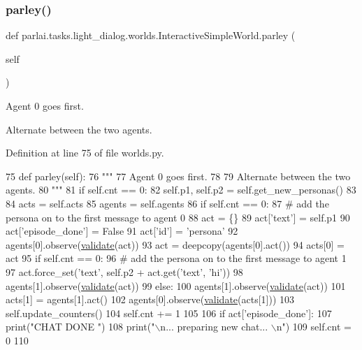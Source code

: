 \subsubsection{\texorpdfstring{parley()}{parley()}}
{\footnotesize\ttfamily def parlai.\+tasks.\+light\+\_\+dialog.\+worlds.\+Interactive\+Simple\+World.\+parley (\begin{DoxyParamCaption}\item[{}]{self }\end{DoxyParamCaption})}

\begin{DoxyVerb}Agent 0 goes first.

Alternate between the two agents.
\end{DoxyVerb}
 

Definition at line 75 of file worlds.\+py.


\begin{DoxyCode}
75     \textcolor{keyword}{def }parley(self):
76         \textcolor{stringliteral}{"""}
77 \textcolor{stringliteral}{        Agent 0 goes first.}
78 \textcolor{stringliteral}{}
79 \textcolor{stringliteral}{        Alternate between the two agents.}
80 \textcolor{stringliteral}{        """}
81         \textcolor{keywordflow}{if} self.cnt == 0:
82             self.p1, self.p2 = self.get\_new\_personas()
83 
84         acts = self.acts
85         agents = self.agents
86         \textcolor{keywordflow}{if} self.cnt == 0:
87             \textcolor{comment}{# add the persona on to the first message to agent 0}
88             act = \{\}
89             act[\textcolor{stringliteral}{'text'}] = self.p1
90             act[\textcolor{stringliteral}{'episode\_done'}] = \textcolor{keyword}{False}
91             act[\textcolor{stringliteral}{'id'}] = \textcolor{stringliteral}{'persona'}
92             agents[0].observe(\hyperlink{namespaceparlai_1_1core_1_1worlds_afc3fad603b7bce41dbdc9cdc04a9c794}{validate}(act))
93         act = deepcopy(agents[0].act())
94         acts[0] = act
95         \textcolor{keywordflow}{if} self.cnt == 0:
96             \textcolor{comment}{# add the persona on to the first message to agent 1}
97             act.force\_set(\textcolor{stringliteral}{'text'}, self.p2 + act.get(\textcolor{stringliteral}{'text'}, \textcolor{stringliteral}{'hi'}))
98             agents[1].observe(\hyperlink{namespaceparlai_1_1core_1_1worlds_afc3fad603b7bce41dbdc9cdc04a9c794}{validate}(act))
99         \textcolor{keywordflow}{else}:
100             agents[1].observe(\hyperlink{namespaceparlai_1_1core_1_1worlds_afc3fad603b7bce41dbdc9cdc04a9c794}{validate}(act))
101         acts[1] = agents[1].act()
102         agents[0].observe(\hyperlink{namespaceparlai_1_1core_1_1worlds_afc3fad603b7bce41dbdc9cdc04a9c794}{validate}(acts[1]))
103         self.update\_counters()
104         self.cnt += 1
105 
106         \textcolor{keywordflow}{if} act[\textcolor{stringliteral}{'episode\_done'}]:
107             print(\textcolor{stringliteral}{"CHAT DONE "})
108             print(\textcolor{stringliteral}{"\(\backslash\)n... preparing new chat... \(\backslash\)n"})
109             self.cnt = 0
110 \end{DoxyCode}


